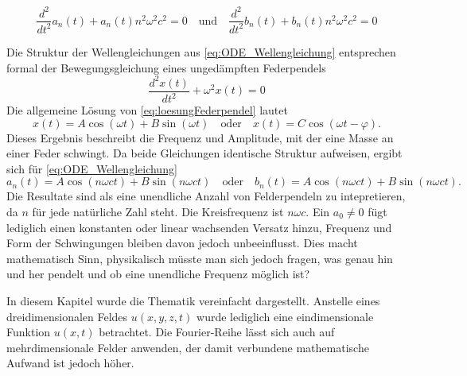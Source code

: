 \begin{equation}\label{eq:ODE_Wellengleichung}
	\frac{d^2}{dt^2} a_n(t) + a_n(t) n^2 \omega^2 c^2 = 0
	  \quad   \text{und} \quad  \frac{d^2}{dt^2} b_n(t) + b_n(t) n^2 \omega^2 c^2 = 0
\end{equation}

Die Struktur der Wellengleichungen aus \eqref{eq:ODE_Wellengleichung} entsprechen formal der Bewegungsgleichung eines ungedämpften Federpendels  
\begin{equation}\label{eq:loesungFederpendel}
	\frac{d^2 x(t)}{d t^2} + \omega^2 x(t) = 0
\end{equation}
Die allgemeine Lösung von \eqref{eq:loesungFederpendel} lautet  
\begin{equation}
	x(t) = A \cos(\omega t) + B \sin(\omega t)
	\quad\text{oder}\quad
	x(t) = C \cos(\omega t - \varphi).
\end{equation}
Dieses Ergebnis beschreibt die Frequenz und Amplitude, mit der eine Masse an einer Feder schwingt.  
Da beide Gleichungen identische Struktur aufweisen, ergibt sich für \eqref{eq:ODE_Wellengleichung} 
\begin{equation}
	a_n(t) = A \cos(n \omega c t) + B \sin(n \omega c t)
	\quad\text{oder}\quad
	b_n(t) = A \cos(n \omega c t) + B \sin(n \omega c t).
\end{equation}
Die Resultate sind als eine unendliche Anzahl von Felderpendeln zu intepretieren, da $n$ für jede natürliche Zahl steht. 
Die Kreisfrequenz ist $n \omega c$. 
Ein $a_0\neq0$ fügt lediglich einen konstanten oder linear wachsenden Versatz hinzu, Frequenz und Form der Schwingungen bleiben davon jedoch unbeeinflusst.
Dies macht mathematisch Sinn, physikalisch müsste man sich jedoch fragen, was genau hin und her pendelt und ob eine unendliche Frequenz möglich ist?



In diesem Kapitel wurde die Thematik vereinfacht dargestellt. 
Anstelle eines dreidimensionalen Feldes $u(x,y,z,t)$ wurde lediglich eine eindimensionale Funktion $u(x,t)$ betrachtet. Die Fourier-Reihe lässt sich auch auf mehrdimensionale Felder anwenden, der damit verbundene mathematische Aufwand ist jedoch höher. 








